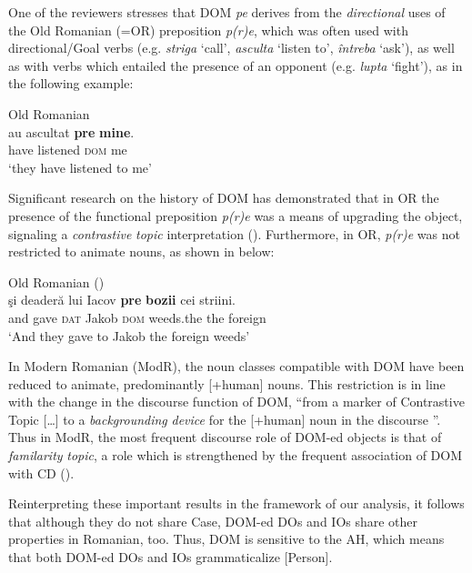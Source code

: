 \documentclass[output=paper,modfonts,nonflat,newtxmath]{langsci/langscibook}
\begin{document}
One of the reviewers stresses that DOM \textit{pe} derives from the \textit{directional} uses of the Old Romanian (=OR) preposition \textit{p(r)e}, which was often used with directional/Goal verbs (e.g. \textit{striga} ‘call’, \textit{asculta} ‘listen to’, \textit{întreba} ‘ask’), as well as with verbs which entailed the presence of an opponent (e.g. \textit{lupta} ‘fight’), as in the following example: 

\ea%
      \label{ex:cornilescu:19}
      Old Romanian \citep[395]{HillMardale2017}\\
      \gll au  ascultat	\textbf{pre} \textbf{mine}.\\
            have listened \textsc{dom} me\\
      \glt ‘they have listened to me’
      \z



Significant research on the history of DOM has demonstrated that in OR the presence of the functional preposition \textit{p(r)e} was a means of upgrading the object, signaling a \textit{contrastive} \textit{topic} interpretation (\citealt{Hill2013, HillMardale2017}). Furthermore, in OR, \textit{p(r)e} was not restricted to animate nouns, as shown in  below:

\ea%
      \label{ex:cornilescu:20}
      Old Romanian  (\citealt[396]{HillMardale2017}) \\
      \gll  şi deaderă lui Iacov \textbf{pre} \textbf{bozii} cei striini.\\
             and gave \textsc{dat} Jakob \textsc{dom} weeds.the the foreign\\
      \glt ‘And they gave to Jakob the foreign weeds’
      \z

In Modern Romanian (ModR), the noun classes compatible with DOM have been reduced to animate, predominantly [+human] nouns. This restriction is in line with the change in the discourse function of DOM, “from a marker of Contrastive Topic […] to a \textit{backgrounding} \textit{device} for the [+human] noun in the discourse \citep[147]{Hill2013}”. Thus in ModR, the most frequent discourse role of DOM-ed objects is that of \textit{familarity} \textit{topic}, a role which is strengthened by the frequent association of DOM with CD (\citealt{HillMardale2017}).

Reinterpreting these important results in the framework of our analysis, it follows that although they do not share Case, DOM-ed DOs and IOs share other properties in Romanian, too. Thus, DOM is sensitive to the AH, which means that both DOM-ed DOs and IOs grammaticalize [Person].
\end{document}
